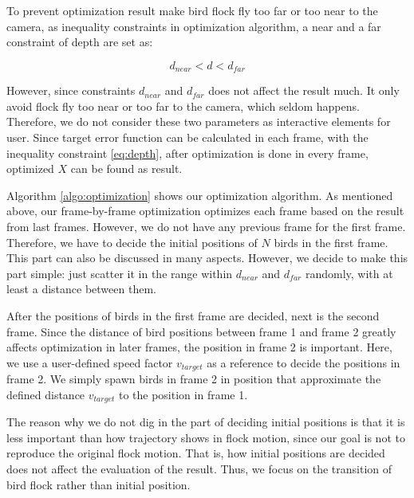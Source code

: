 To prevent optimization result make bird flock fly too far or too near to the camera, as inequality constraints in optimization algorithm, a near and a far constraint of depth are set as:


\begin{equation}\label{eq:depth}
d_{near} < d < d_{far}
\end{equation}


However, since constraints $d_{near}$ and $d_{far}$ does not affect the result much. It only avoid flock fly too near or too far to the camera, which seldom happens. Therefore, we do not consider these two parameters as interactive elements for user. Since target error function can be calculated in each frame, with the inequality constraint \ref{eq:depth}, after optimization is done in every frame, optimized $X$ can be found as result.


Algorithm \ref{algo:optimization}  shows our optimization algorithm. As mentioned above, our frame-by-frame optimization optimizes each frame based on the result from last frames. However, we do not have any previous frame for the first frame. Therefore, we have to decide the initial positions of $N$ birds in the first frame. This part can also be discussed in many aspects. However, we decide to make this part simple: just scatter it in the range within $d_{near}$ and $d_{far}$ randomly, with at least a distance between them.


After the positions of birds in the first frame are decided, next is the second frame. Since the distance of bird positions between frame 1 and frame 2 greatly affects optimization in later frames, the position in frame 2 is important. Here, we use a user-defined speed factor $v_{target}$ as a reference to decide the positions in frame 2. We simply spawn birds in frame 2 in position that approximate the defined distance $v_{target}$ to the position in frame 1.


The reason why we do not dig in the part of deciding initial positions is that it is less important than how trajectory shows in flock motion, since our goal is not to reproduce the original flock motion. That is, how initial positions are decided does not affect the evaluation of the result. Thus, we focus on the transition of bird flock rather than initial position. 


